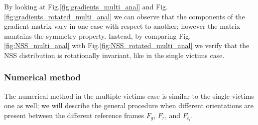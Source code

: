 \noindent
By looking at Fig.\ref{fig:gradients_multi_anal} and Fig.\ref{fig:gradients_rotated_multi_anal}
we can observe that the components of the gradient matrix vary in one case with respect to another;
however the matrix mantains the symmetry property.
Instead, by comparing Fig.\ref{fig:NSS_multi_anal} with Fig.\ref{fig:NSS_rotated_multi_anal}
we verify that the NSS distribution is rotationally invariant, like in the single victims case.

\subsubsection{Numerical method}
The numerical method in the multiple-victims case is similar to the single-victims one as well;
we will describe the general procedure when different orientations
are present between the different reference frames $F_g$, $F_r$, and $F_{t_i}$.

